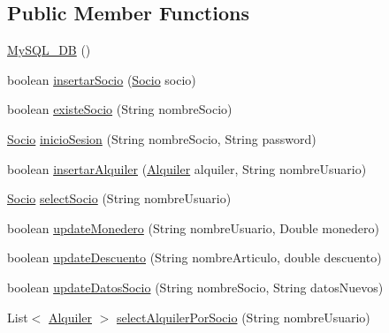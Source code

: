 \subsection*{Public Member Functions}
\begin{DoxyCompactItemize}
\item 
\mbox{\hyperlink{classes_1_1deusto_1_1server_1_1db_1_1_my_s_q_l___d_b_aea1d77cd2574a2c2457d231c8c7c2d56}{My\+S\+Q\+L\+\_\+\+DB}} ()
\item 
boolean \mbox{\hyperlink{classes_1_1deusto_1_1server_1_1db_1_1_my_s_q_l___d_b_a0959c3a64f052449cb5d79444a2d0900}{insertar\+Socio}} (\mbox{\hyperlink{classes_1_1deusto_1_1client_1_1data_1_1_socio}{Socio}} socio)
\item 
boolean \mbox{\hyperlink{classes_1_1deusto_1_1server_1_1db_1_1_my_s_q_l___d_b_a96e7c2f7a533e8d9d4802ac1ee54dfdf}{existe\+Socio}} (String nombre\+Socio)
\item 
\mbox{\hyperlink{classes_1_1deusto_1_1client_1_1data_1_1_socio}{Socio}} \mbox{\hyperlink{classes_1_1deusto_1_1server_1_1db_1_1_my_s_q_l___d_b_a2af44018d93fc4b14ddbb3e4bdd8bf05}{inicio\+Sesion}} (String nombre\+Socio, String password)
\item 
boolean \mbox{\hyperlink{classes_1_1deusto_1_1server_1_1db_1_1_my_s_q_l___d_b_aa72369de0326a5904e3e9c83a3bff777}{insertar\+Alquiler}} (\mbox{\hyperlink{classes_1_1deusto_1_1client_1_1data_1_1_alquiler}{Alquiler}} alquiler, String nombre\+Usuario)
\item 
\mbox{\hyperlink{classes_1_1deusto_1_1client_1_1data_1_1_socio}{Socio}} \mbox{\hyperlink{classes_1_1deusto_1_1server_1_1db_1_1_my_s_q_l___d_b_a36eec47b7d590c9dd37aec41af2033db}{select\+Socio}} (String nombre\+Usuario)
\item 
boolean \mbox{\hyperlink{classes_1_1deusto_1_1server_1_1db_1_1_my_s_q_l___d_b_a202f75db3e7f693f85af3fa38d7f1939}{update\+Monedero}} (String nombre\+Usuario, Double monedero)
\item 
boolean \mbox{\hyperlink{classes_1_1deusto_1_1server_1_1db_1_1_my_s_q_l___d_b_ad2208a15e02b51a82e8cbd9afd4ea939}{update\+Descuento}} (String nombre\+Articulo, double descuento)
\item 
boolean \mbox{\hyperlink{classes_1_1deusto_1_1server_1_1db_1_1_my_s_q_l___d_b_aa2865a9bd2ac6181664979c3a61615e1}{update\+Datos\+Socio}} (String nombre\+Socio, String datos\+Nuevos)
\item 
List$<$ \mbox{\hyperlink{classes_1_1deusto_1_1client_1_1data_1_1_alquiler}{Alquiler}} $>$ \mbox{\hyperlink{classes_1_1deusto_1_1server_1_1db_1_1_my_s_q_l___d_b_a0b29a31e081a796511d06da22eece230}{select\+Alquiler\+Por\+Socio}} (String nombre\+Usuario)

\end{DoxyCompactItemize}
